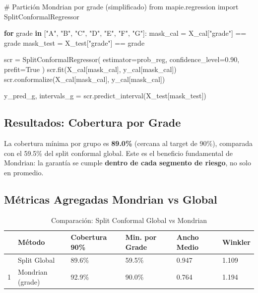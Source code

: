 \documentclass[
  spanish,
  11pt,
  letterpaper,
]{scrbook}
\newenvironment{Shaded}{\begin{snugshade}}{\end{snugshade}}
\newcommand{\CommentTok}[1]{\textcolor[rgb]{0.37,0.37,0.37}{#1}}
\newcommand{\ControlFlowTok}[1]{\textcolor[rgb]{0.00,0.23,0.31}{\textbf{#1}}}
\newcommand{\FloatTok}[1]{\textcolor[rgb]{0.68,0.00,0.00}{#1}}
\newcommand{\ImportTok}[1]{\textcolor[rgb]{0.00,0.46,0.62}{#1}}
\newcommand{\KeywordTok}[1]{\textcolor[rgb]{0.00,0.23,0.31}{\textbf{#1}}}
\newcommand{\NormalTok}[1]{\textcolor[rgb]{0.00,0.23,0.31}{#1}}
\newcommand{\OperatorTok}[1]{\textcolor[rgb]{0.37,0.37,0.37}{#1}}
\newcommand{\StringTok}[1]{\textcolor[rgb]{0.13,0.47,0.30}{#1}}
\newcommand{\VariableTok}[1]{\textcolor[rgb]{0.07,0.07,0.07}{#1}}
\theoremstyle{plain}
\theoremstyle{remark}
\begin{document}
\begin{Shaded}
\begin{Highlighting}[]
\CommentTok{\# Partición Mondrian por grade (simplificado)}
\ImportTok{from}\NormalTok{ mapie.regression }\ImportTok{import}\NormalTok{ SplitConformalRegressor}

\ControlFlowTok{for}\NormalTok{ grade }\KeywordTok{in}\NormalTok{ [}\StringTok{"A"}\NormalTok{, }\StringTok{"B"}\NormalTok{, }\StringTok{"C"}\NormalTok{, }\StringTok{"D"}\NormalTok{, }\StringTok{"E"}\NormalTok{, }\StringTok{"F"}\NormalTok{, }\StringTok{"G"}\NormalTok{]:}
\NormalTok{    mask\_cal }\OperatorTok{=}\NormalTok{ X\_cal[}\StringTok{"grade"}\NormalTok{] }\OperatorTok{==}\NormalTok{ grade}
\NormalTok{    mask\_test }\OperatorTok{=}\NormalTok{ X\_test[}\StringTok{"grade"}\NormalTok{] }\OperatorTok{==}\NormalTok{ grade}

\NormalTok{    scr }\OperatorTok{=}\NormalTok{ SplitConformalRegressor(}
\NormalTok{        estimator}\OperatorTok{=}\NormalTok{prob\_reg, confidence\_level}\OperatorTok{=}\FloatTok{0.90}\NormalTok{, prefit}\OperatorTok{=}\VariableTok{True}
\NormalTok{    )}
\NormalTok{    scr.fit(X\_cal[mask\_cal], y\_cal[mask\_cal])}
\NormalTok{    scr.conformalize(X\_cal[mask\_cal], y\_cal[mask\_cal])}

\NormalTok{    y\_pred\_g, intervals\_g }\OperatorTok{=}\NormalTok{ scr.predict\_interval(X\_test[mask\_test])}
\end{Highlighting}
\end{Shaded}

\subsection{Resultados: Cobertura por
Grade}\label{resultados-cobertura-por-grade}

La cobertura mínima por grupo es \textbf{89.0\%} (cercana al target de
90\%), comparada con el 59.5\% del split conformal global. Este es el
beneficio fundamental de Mondrian: la garantía se cumple \textbf{dentro
de cada segmento de riesgo}, no solo en promedio.

\subsection{Métricas Agregadas Mondrian vs
Global}\label{muxe9tricas-agregadas-mondrian-vs-global}

{

\begin{longtable}[]{@{}llllll@{}}

\caption{\label{tbl-mondrian-vs-global}Comparación: Split Conformal
Global vs Mondrian}

\tabularnewline

\toprule\noalign{}
& Método & Cobertura 90\% & Min. por Grade & Ancho Medio & Winkler \\
\midrule\noalign{}
\endhead
\bottomrule\noalign{}
\endlastfoot
0 & Split Global & 89.6\% & 59.5\% & 0.947 & 1.109 \\
1 & Mondrian (grade) & 92.9\% & 90.0\% & 0.764 & 1.194 \\

\end{longtable}

}
\end{document}
